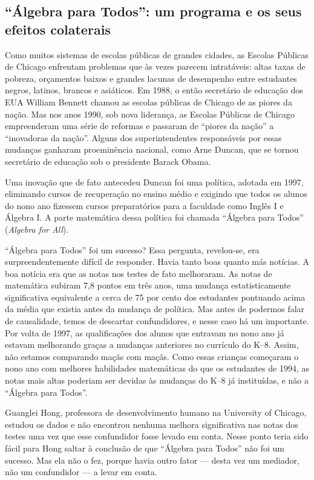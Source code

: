 \documentclass[11pt,a5paper,twoside]{book}
\begin{document}
\subsection{“Álgebra para Todos”: um programa e os seus efeitos colaterais}
Como muitos sistemas de escolas públicas de grandes cidades, as Escolas Públicas de Chicago enfrentam problemas que às vezes parecem intratáveis: altas taxas de pobreza, orçamentos baixos e grandes lacunas de desempenho entre estudantes negros, latinos, brancos e asiáticos. Em 1988, o então secretário de educação dos EUA William Bennett chamou as escolas públicas de Chicago de as piores da nação. Mas nos anos 1990, sob nova liderança, as Escolas Públicas de Chicago empreenderam uma série de reformas e passaram de “piores da nação” a “inovadoras da nação”. Alguns dos superintendentes responsáveis por essas mudanças ganharam proeminência nacional, como Arne Duncan, que se tornou secretário de educação sob o presidente Barack Obama.

Uma inovação que de fato antecedeu Duncan foi uma política, adotada em 1997, eliminando cursos de recuperação no ensino médio e exigindo que todos os alunos do nono ano fizessem cursos preparatórios para a faculdade como Inglês I e Álgebra I. A parte matemática dessa política foi chamada “Álgebra para Todos” (\textit{Algebra for All}).

“Álgebra para Todos” foi um sucesso? Essa pergunta, revelou-se, era surpreendentemente difícil de responder. Havia tanto boas quanto más notícias. A boa notícia era que as notas nos testes de fato melhoraram. As notas de matemática subiram 7,8 pontos em três anos, uma mudança estatisticamente significativa equivalente a cerca de 75 por cento dos estudantes pontuando acima da média que existia antes da mudança de política. Mas antes de podermos falar de causalidade, temos de descartar confundidores, e nesse caso há um importante. Por volta de 1997, as qualificações dos alunos que entravam no nono ano já estavam melhorando graças a mudanças anteriores no currículo do K–8. Assim, não estamos comparando maçãs com maçãs. Como essas crianças começaram o nono ano com melhores habilidades matemáticas do que os estudantes de 1994, as notas mais altas poderiam ser devidas às mudanças do K–8 já instituídas, e não a “Álgebra para Todos”.

Guanglei Hong, professora de desenvolvimento humano na University of Chicago, estudou os dados e não encontrou nenhuma melhora significativa nas notas dos testes uma vez que esse confundidor fosse levado em conta. Nesse ponto teria sido fácil para Hong saltar à conclusão de que “Álgebra para Todos” não foi um sucesso. Mas ela não o fez, porque havia outro fator — desta vez um mediador, não um confundidor — a levar em conta.
\end{document}

